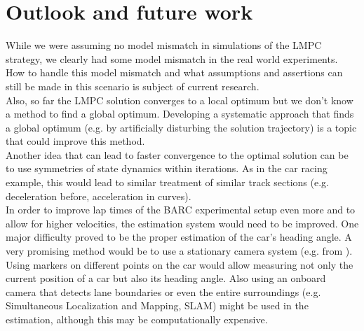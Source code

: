 
\section{Outlook and future work}
While we were assuming no model mismatch in simulations of the LMPC strategy, we clearly had some model mismatch in the real world experiments. How to handle this model mismatch and what assumptions and assertions can still be made in this scenario is subject of current research.\\
Also, so far the LMPC solution converges to a local optimum but we don't know a method to find a global optimum. Developing a systematic approach that finds a global optimum (e.g. by artificially disturbing the solution trajectory) is a topic that could improve this method.\\
Another idea that can lead to faster convergence to the optimal solution can be to use symmetries of state dynamics within iterations. As in the car racing example, this would lead to similar treatment of similar track sections (e.g. deceleration before, acceleration in curves).\\
In order to improve lap times of the BARC experimental setup even more and to allow for higher velocities, the estimation system would need to be improved. One major difficulty proved to be the proper estimation of the car's heading angle. A very promising method would be to use a stationary camera system (e.g. from \cite{Liniger2015}). Using markers on different points on the car would allow measuring not only the current position of a car but also its heading angle. Also using an onboard camera that detects lane boundaries or even the entire surroundings (e.g. Simultaneous Localization and Mapping, SLAM) might be used in the estimation, although this may be computationally expensive.\\

